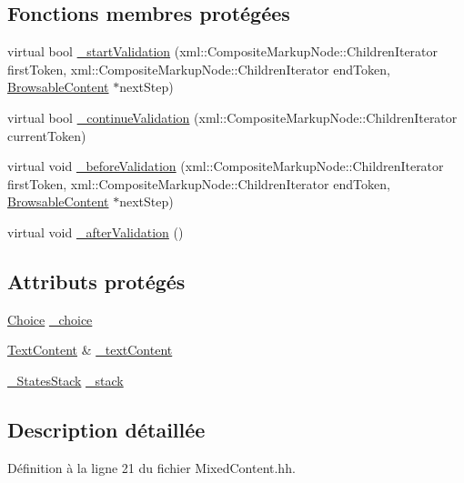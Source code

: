 \subsection*{Fonctions membres protégées}
\begin{DoxyCompactItemize}
\item 
virtual bool \hyperlink{classdtd_1_1_mixed_content_ae2b12465df5873a58676315a563d1581}{\_\-startValidation} (xml::CompositeMarkupNode::ChildrenIterator firstToken, xml::CompositeMarkupNode::ChildrenIterator endToken, \hyperlink{classdtd_1_1_browsable_content}{BrowsableContent} $\ast$nextStep)
\item 
virtual bool \hyperlink{classdtd_1_1_mixed_content_a20d254e2b4366855818e1dd033d0736d}{\_\-continueValidation} (xml::CompositeMarkupNode::ChildrenIterator currentToken)
\item 
virtual void \hyperlink{classdtd_1_1_mixed_content_abb31ae73269d3bb10e6f5379332b1459}{\_\-beforeValidation} (xml::CompositeMarkupNode::ChildrenIterator firstToken, xml::CompositeMarkupNode::ChildrenIterator endToken, \hyperlink{classdtd_1_1_browsable_content}{BrowsableContent} $\ast$nextStep)
\item 
virtual void \hyperlink{classdtd_1_1_mixed_content_a1ad4f7436239c9cc9bd792b85447ee6b}{\_\-afterValidation} ()
\end{DoxyCompactItemize}
\subsection*{Attributs protégés}
\begin{DoxyCompactItemize}
\item 
\hyperlink{classdtd_1_1_choice}{Choice} \hyperlink{classdtd_1_1_mixed_content_a69bcdfa733df68aee3d6d48b8ee9fab1}{\_\-choice}
\item 
\hyperlink{classdtd_1_1_text_content}{TextContent} \& \hyperlink{classdtd_1_1_mixed_content_af8e3d219de7501a3cd397e913be22f2f}{\_\-textContent}
\item 
\hyperlink{classdtd_1_1_mixed_content_af406cf95bf434a84082758aab801296d}{\_\-StatesStack} \hyperlink{classdtd_1_1_mixed_content_a8da3d196eb875933a34c03190e1b3702}{\_\-stack}
\end{DoxyCompactItemize}


\subsection{Description détaillée}


Définition à la ligne 21 du fichier MixedContent.hh.



